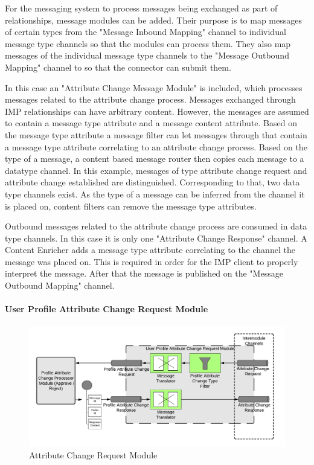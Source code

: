 For the messaging system to process messages being exchanged as part of relationships, message modules can be added. Their purpose is to map messages of certain types from the "Message Inbound Mapping" channel to individual message type channels so that the modules can process them. They also map messages of the individual message type channels to the "Message Outbound Mapping" channel to so that the connector can submit them.

In this case an "Attribute Change Message Module" is included, which processes messages related to the attribute change process. Messages exchanged through IMP relationships can have arbitrary content. However, the messages are assumed to contain a message type attribute and a message content attribute. Based on the message type attribute a message filter can let messages through that contain a message type attribute correlating to an attribute change process. Based on the type of a message, a content based message router then copies each message to a datatype channel. In this example, messages of type attribute change request and attribute change established are distinguished. Corresponding to that, two data type channels exist. As the type of a message can be inferred from the channel it is placed on, content filters can remove the message type attributes.

Outbound messages related to the attribute change process are consumed in data type channels. In this case it is only one "Attribute Change Response" channel. A Content Enricher adds a message type attribute correlating to the channel the message was placed on. This is required in order for the IMP client to properly interpret the message. After that the message is published on the "Message Outbound Mapping" channel.

\paragraph{User Profile Attribute Change Request Module}

\begin{figure}[h!]
    \centering
    \includegraphics[scale=0.6]{Diagrams/Integration Architecture 1/Technological Integration/12. Attribute Change Request Module.pdf}
    \caption{Attribute Change Request Module}
    \label{integration1:attribute_change_request_module}
\end{figure}

